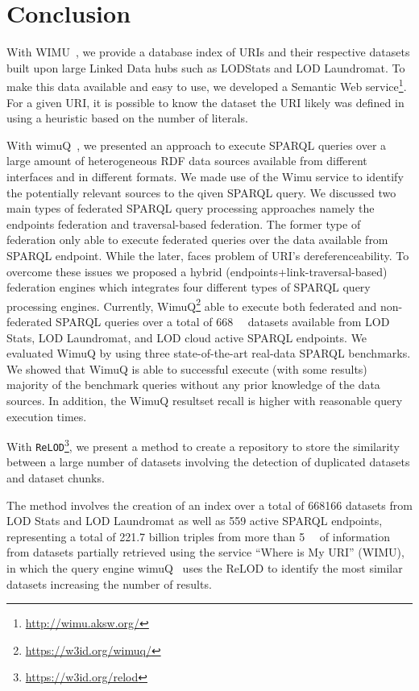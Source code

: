 \documentclass[sw]{iosart2x}
\begin{document}
\section{Conclusion}
\label{sec:conc}

With WIMU~\cite{valdestilhas2018my}, we provide a database index of URIs and their respective datasets built upon large Linked Data hubs such as LODStats and LOD Laundromat.
To make this data available and easy to use, we developed a Semantic Web service\footnote{\url{http://wimu.aksw.org/}}.
For a given URI, it is possible to know the dataset the URI likely was defined in using a heuristic based on the number of literals.

With wimuQ~\cite{valdestilhas2019more}, we presented an approach to execute SPARQL queries over a large amount of heterogeneous RDF data sources available from different interfaces and in different formats. We made use of the Wimu service to identify the potentially relevant sources to the qiven SPARQL query. We discussed two main types of federated SPARQL query processing approaches namely the endpoints federation and traversal-based federation. The former type of federation only able to execute federated queries over the data available from SPARQL endpoint. While the later, faces problem of URI's dereferenceability. To overcome these issues we proposed a hybrid (endpoints+link-traversal-based) federation engines which integrates four different types of SPARQL query processing engines. Currently, WimuQ\footnote{\url{https://w3id.org/wimuq/}} able to execute both federated and non-federated SPARQL queries over a total of \SI{668}{\kilo\nothing} datasets available from LOD Stats, LOD Laundromat, and LOD cloud active SPARQL endpoints. We evaluated WimuQ by using three state-of-the-art real-data SPARQL benchmarks. We showed that WimuQ is able to successful execute (with some results) majority of the benchmark queries without any prior knowledge of the data sources. In addition, the WimuQ resultset recall is higher with reasonable query execution times. 

With \texttt{ReLOD}\footnote{\url{https://w3id.org/relod}}, we present a method to create a repository to store the similarity between a large number of datasets involving the detection of duplicated datasets and dataset chunks.

The method involves the creation of an index over a total of \num{668166} datasets from LOD Stats and LOD Laundromat as well as 559 active SPARQL endpoints, representing a total of \num{221.7} billion triples from more than \SI{5}{\tebi\byte} of information from datasets partially retrieved using the service ``Where is My URI'' (WIMU)\cite{valdestilhas2018my}, in which the query engine wimuQ~\cite{valdestilhas2019more} uses the ReLOD to identify the most similar datasets increasing the number of results. 
\end{document}

